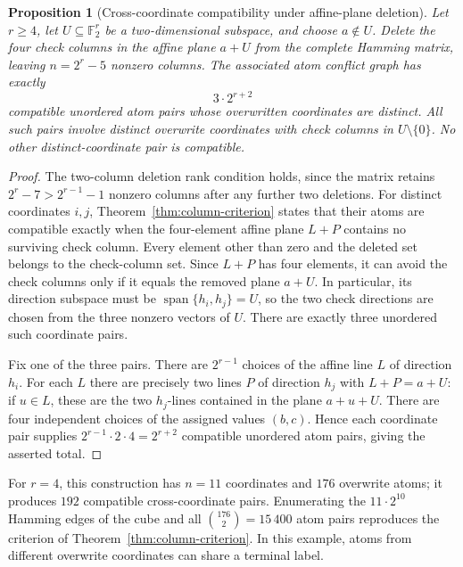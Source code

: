 \documentclass[11pt,a4paper]{article}
\newtheorem{proposition}[theorem]{Proposition}
\begin{document}
\begin{proposition}[Cross-coordinate compatibility under affine-plane deletion]\label{prop:affine-deletion}
Let $r\ge4$, let $U\subseteq\mathbb F_2^r$ be a two-dimensional subspace, and choose $a\notin U$. Delete the four check columns in the affine plane $a+U$ from the complete Hamming matrix, leaving $n=2^r-5$ nonzero columns. The associated atom conflict graph has exactly
\[
\boxed{\quad 3\cdot2^{r+2}\quad}
\]
compatible unordered atom pairs whose overwritten coordinates are distinct. All such pairs involve distinct overwrite coordinates with check columns in $U\setminus\{0\}$. No other distinct-coordinate pair is compatible.
\end{proposition}
\begin{proof}
The two-column deletion rank condition holds, since the matrix retains $2^r-7>2^{r-1}-1$ nonzero columns after any further two deletions. For distinct coordinates $i,j$, Theorem~\ref{thm:column-criterion} states that their atoms are compatible exactly when the four-element affine plane $L+P$ contains no surviving check column. Every element other than zero and the deleted set belongs to the check-column set. Since $L+P$ has four elements, it can avoid the check columns only if it equals the removed plane $a+U$. In particular, its direction subspace must be $\operatorname{span}\{h_i,h_j\}=U$, so the two check directions are chosen from the three nonzero vectors of $U$. There are exactly three unordered such coordinate pairs.

Fix one of the three pairs. There are $2^{r-1}$ choices of the affine line $L$ of direction $h_i$. For each $L$ there are precisely two lines $P$ of direction $h_j$ with $L+P=a+U$: if $u\in L$, these are the two $h_j$-lines contained in the plane $a+u+U$. There are four independent choices of the assigned values $(b,c)$. Hence each coordinate pair supplies $2^{r-1}\cdot 2\cdot 4=2^{r+2}$ compatible unordered atom pairs, giving the asserted total.
\end{proof}

For $r=4$, this construction has $n=11$ coordinates and $176$ overwrite atoms; it produces $192$ compatible cross-coordinate pairs. Enumerating the $11\cdot2^{10}$ Hamming edges of the cube and all $\binom{176}{2}=15\,400$ atom pairs reproduces the criterion of Theorem~\ref{thm:column-criterion}. In this example, atoms from different overwrite coordinates can share a terminal label.
\end{document}
